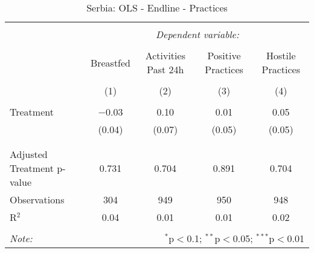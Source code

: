 
\begin{table}[!htbp] \centering 
  \caption{Serbia: OLS - Endline - Practices} 
  \label{tbl:Serbia: OLS - Endline - Practices} 
\begin{tabular}{@{\extracolsep{5pt}}lcccc} 
\\[-1.8ex]\hline 
\hline \\[-1.8ex] 
 & \multicolumn{4}{c}{\textit{Dependent variable:}} \\ 
\cline{2-5} 
\\[-1.8ex] & Breastfed & Activities Past 24h & Positive Practices & Hostile Practices \\ 
\\[-1.8ex] & (1) & (2) & (3) & (4)\\ 
\hline \\[-1.8ex] 
 Treatment & $-$0.03 & 0.10 & 0.01 & 0.05 \\ 
  & (0.04) & (0.07) & (0.05) & (0.05) \\ 
  & & & & \\ 
\hline \\[-1.8ex] 
Adjusted Treatment p-value & 0.731 & 0.704 & 0.891 & 0.704 \\ 
Observations & 304 & 949 & 950 & 948 \\ 
R$^{2}$ & 0.04 & 0.01 & 0.01 & 0.02 \\ 
\hline 
\hline \\[-1.8ex] 
\textit{Note:}  & \multicolumn{4}{r}{$^{*}$p$<$0.1; $^{**}$p$<$0.05; $^{***}$p$<$0.01} \\ 
\end{tabular} 
\end{table} 
